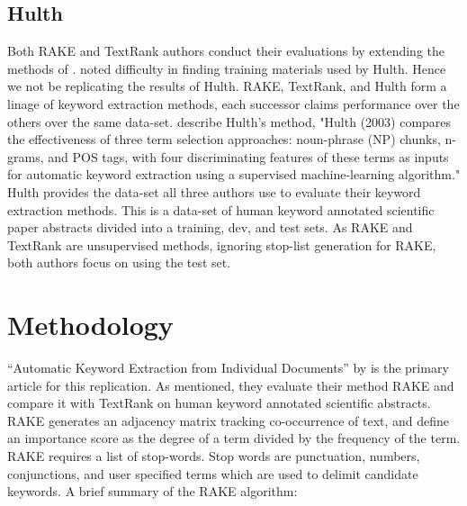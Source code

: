 \documentclass[11pt,a4paper]{article}
\begin{document}
\subsection{Hulth}

Both RAKE and TextRank authors conduct their evaluations by extending the methods of \citet{hulth-2003-improved}. \citet{1} noted difficulty in finding training materials used by Hulth. Hence we not be replicating the results of Hulth. RAKE, TextRank, and Hulth form a linage of keyword extraction methods, each successor claims performance over the others over the same data-set. \citet{1} describe Hulth's method, "Hulth (2003) compares the effectiveness of three term selection approaches: noun-phrase (NP) chunks, n-grams, and POS tags, with four discriminating features of these terms as inputs for automatic keyword extraction using a supervised machine-learning algorithm." Hulth provides the data-set all three authors use to evaluate their keyword extraction methods. This is a data-set of human keyword annotated scientific paper abstracts divided into a training, dev, and test sets. As RAKE and TextRank are unsupervised methods, ignoring stop-list generation for RAKE, both authors focus on using the test set. 

\section{Methodology}

“Automatic Keyword Extraction from Individual Documents” by \citet{1} is the primary article for this replication. As mentioned, they evaluate their method RAKE and compare it with TextRank on human keyword annotated scientific abstracts. RAKE generates an adjacency matrix tracking co-occurrence of text, and define an importance score as the degree of a term divided by the frequency of the term. RAKE requires a list of stop-words. Stop words are punctuation, numbers, conjunctions, and user specified terms which are used to delimit candidate keywords. A brief summary of the RAKE algorithm:
\end{document}
